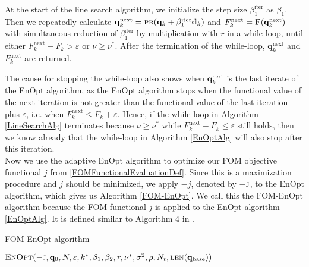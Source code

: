 At the start of the line search algorithm, we initialize the step size $\beta^\mathrm{iter}_1$ as $\beta_1$. Then we repeatedly calculate $\mathbf{q}^\mathrm{next}_k = \Call{pr}{\mathbf{q}_k+\beta^\mathrm{iter}_1\mathbf{d}_k}$ and $F^\mathrm{next}_k = \Call{F}{\mathbf{q}^\mathrm{next}_k}$ with simultaneous reduction of $\beta^\mathrm{iter}_1$ by multiplication with $r$ in a while-loop, until either $F^\mathrm{next}_k-F_k>\varepsilon$ or $\nu\geq\nu^*$. After the termination of the while-loop, $\mathbf{q}^\mathrm{next}_k$ and $F^\mathrm{next}_k$ are returned.

The cause for stopping the while-loop also shows when $\mathbf{q}^\mathrm{next}_k$ is the last iterate of the EnOpt algorithm, as the EnOpt algorithm stops when the functional value of the next iteration is not greater than the functional value of the last iteration plus $\varepsilon$, i.e. when $F^\mathrm{next}_k\leq F_k+\varepsilon$. Hence, if the while-loop in Algorithm \ref{LineSearchAlg} terminates because $\nu\geq\nu^*$ while $F^\mathrm{next}_k-F_k\leq\varepsilon$ still holds, then we know already that the while-loop in Algorithm \ref{EnOptAlg} will also stop after this iteration.\\

Now we use the adaptive EnOpt algorithm to optimize our FOM objective functional $j$ from \eqref{FOMFunctionalEvaluationDef}. Since this is a maximization procedure and $j$ should be minimized, we apply $-j$, denoted by $-\textproc{j}$, to the EnOpt algorithm, which gives us Algorithm \ref{FOM-EnOpt}. We call this the FOM-EnOpt algorithm because the FOM functional $j$ is applied to the EnOpt algorithm \ref{EnOptAlg}. It is defined similar to Algorithm 4 in \cite{Keil2022-dj}.

\begin{algorithm}[H]%
\caption{\label{FOM-EnOpt}FOM-EnOpt algorithm}
\begin{algorithmic}[1]
\State \Return $\Call{EnOpt}{-\textproc{j},\mathbf{q}_0,N,\varepsilon,k^*,\beta_1,\beta_2,r,\nu^*,\sigma^2,\rho, N_t, \protect\Call{len}{\mathbf{q}_\mathrm{base}}}$
\EndFunction
\end{algorithmic}
\end{algorithm}

